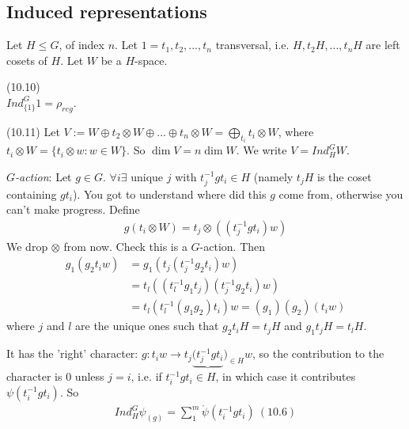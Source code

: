 \documentclass[a4paper]{article}
\begin{document}
\subsection{Induced representations}
Let $H \leq G$, of index $n$. Let $1=t_1,t_2,...,t_n$ transversal, i.e. $H,t_2H,...,t_n H$ are left cosets of $H$. Let $W$ be a $H$-space.

\begin{lemma} (10.10)\\
$Ind_{\{1\}}^G 1= \rho_{reg}$.
\end{lemma}

\begin{defi} (10.11)
Let $V:=W \oplus t_2\otimes W \oplus ... \oplus t_n \otimes W = \bigoplus_{t_i} t_i \otimes W$, where $t_i \otimes W = \{t_i \otimes w: w \in W\}$. So $\dim V = n\dim W$. We write $V = Ind_H^G W$.
\end{defi}

\emph{$G$-action}: Let $g \in G$. $\forall i \exists $ unique $j$ with $t_j^{-1} g t_i \in H$ (namely $t_j H$ is the coset containing $gt_i$). You got to understand where did this $g$ come from, otherwise you can't make progress. Define
\begin{equation*}
\begin{aligned}
g(t_i \otimes W) = t_j \otimes ((t_j^{-1} gt_i) w)
\end{aligned}
\end{equation*}
We drop $\otimes$ from now. Check this is a $G$-action. Then
\begin{equation*}
\begin{aligned}
g_1(g_2 t_i w) &= g_1(t_j(t_j^{-1} g_2t_i)w)\\
&= t_l((t_l^{-1}g_1t_j)(t_j^{-1}g_2 t_i)w)\\
&= t_l (t_l^{-1} (g_1g_2) t_i)w = (g_1)(g_2) (t_i w)
\end{aligned}
\end{equation*}
where $j$ and $l$ are the unique ones such that $g_2 t_iH = t_jH$ and $g_1 t_j H = t_l H$.

It has the 'right' character: $g:t_i w \to t_j \underbrace{(t_j^{-1} gt_i})_{ \in H} w$, so the contribution to the character is $0$ unless $j=i$, i.e. if $t_i^{-1} gt_i \in H$, in which case it contributes $\psi(t_i^{-1} gt_i)$. So
\begin{equation*}
\begin{aligned}
Ind_H^G \psi_(g) = \sum_1^m \mathring{\psi} (t_i^{-1} gt_i)\ (10.6)
\end{aligned}
\end{equation*}
\end{document}
